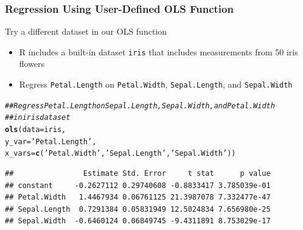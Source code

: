 \documentclass{beamer}\usepackage[]{graphicx}\usepackage[]{color}
\makeatletter
\newcommand{\hlstr}[1]{\textcolor[rgb]{0.192,0.494,0.8}{#1}}%
\newcommand{\hlcom}[1]{\textcolor[rgb]{0.678,0.584,0.686}{\textit{#1}}}%
\newcommand{\hlstd}[1]{\textcolor[rgb]{0.345,0.345,0.345}{#1}}%
\newcommand{\hlkwc}[1]{\textcolor[rgb]{0.333,0.667,0.333}{#1}}%
\newcommand{\hlkwd}[1]{\textcolor[rgb]{0.737,0.353,0.396}{\textbf{#1}}}%
\newenvironment{kframe}{%
 \def\at@end@of@kframe{}%
 \ifinner\ifhmode%
  \def\at@end@of@kframe{\end{minipage}}%
  \begin{minipage}{\columnwidth}%
 \fi\fi%
 \def\FrameCommand##1{\hskip\@totalleftmargin \hskip-\fboxsep
 \colorbox{shadecolor}{##1}\hskip-\fboxsep
     \hskip-\linewidth \hskip-\@totalleftmargin \hskip\columnwidth}%
 \MakeFramed {\advance\hsize-\width
   \@totalleftmargin\z@ \linewidth\hsize
   \@setminipage}}%
 {\par\unskip\endMakeFramed%
 \at@end@of@kframe}
\newenvironment{knitrout}{}{} %
\makeatother
\begin{document}
\begin{frame}[fragile]\frametitle{Regression Using User-Defined OLS Function}
    Try a different dataset in our OLS function
    \begin{itemize}
        \item R includes a built-in dataset \texttt{iris} that includes measurements from 50 iris flowers
        \item Regress \texttt{Petal.Length} on \texttt{Petal.Width}, \texttt{Sepal.Length}, and \texttt{Sepal.Width}
    \end{itemize}
\begin{knitrout}\footnotesize
{}\color{fgcolor}\begin{kframe}
\begin{alltt}
\hlcom{## Regress Petal.Length on Sepal.Length, Sepal.Width, and Petal.Width }
\hlcom{## in iris dataset}
\hlkwd{ols}\hlstd{(}\hlkwc{data} \hlstd{= iris,}
    \hlkwc{y_var} \hlstd{=} \hlstr{'Petal.Length'}\hlstd{,}
    \hlkwc{x_vars} \hlstd{=} \hlkwd{c}\hlstd{(}\hlstr{'Petal.Width'}\hlstd{,} \hlstr{'Sepal.Length'}\hlstd{,} \hlstr{'Sepal.Width'}\hlstd{))}
\end{alltt}
\begin{verbatim}
##                Estimate Std. Error     t stat      p value
## constant     -0.2627112 0.29740608 -0.8833417 3.785039e-01
## Petal.Width   1.4467934 0.06761125 21.3987078 7.332477e-47
## Sepal.Length  0.7291384 0.05831949 12.5024834 7.656980e-25
## Sepal.Width  -0.6460124 0.06849745 -9.4311891 8.753029e-17
\end{verbatim}
\end{kframe}
\end{knitrout}
\end{frame}
\end{document}
